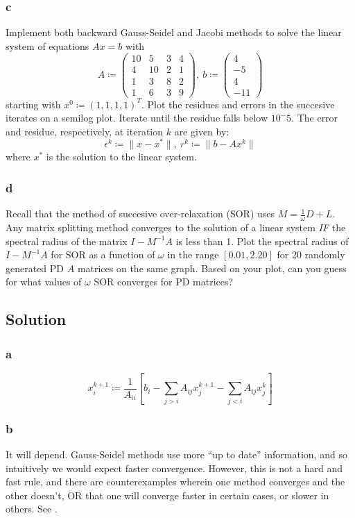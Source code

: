 \documentclass[11pt]{report}
\theoremstyle{definition}
\begin{document}
\subsubsection*{c}
Implement both backward Gauss-Seidel and Jacobi methods to solve the linear system of equations
$Ax=b$ with
\[
	A\coloneqq \begin{pmatrix}
		10 & 5  & 3 & 4 \\
		4  & 10 & 2 & 1 \\
		1  & 3  & 8 & 2 \\
		1  & 6  & 3 & 9
	\end{pmatrix},\
	b\coloneqq \begin{pmatrix}
		4 \\ -5 \\ 4 \\ -11
	\end{pmatrix}
\]
starting with $x^0\coloneqq (1,1,1,1)^T$. Plot the residues and errors in the
succesive iterates on a semilog plot. Iterate until the residue falls below $10^-5$. The error and residue, respectively, at iteration $k$ are given by:
\[ \epsilon^k\coloneqq \|x-x^*\|,\ r^k\coloneqq \|b-Ax^k\| \]
where $x^*$ is the solution to the linear system.

\subsubsection*{d}
Recall that the method of succesive over-relaxation (SOR) uses
$M=\frac{1}{\omega}D+L$. Any matrix splitting method converges to the solution
of a linear system \textit{IF} the spectral radius of the matrix $I-M^{-1}A$ is
less than 1. Plot the spectral radius of $I-M^{-1}A$ for SOR as a function of
$\omega$ in the range $[0.01, 2.20]$ for 20 randomly generated PD $A$ matrices
on the same graph. Based on your plot, can you guess for what values of $\omega$
SOR converges for PD matrices?


\subsection*{Solution}
\subsubsection*{a}
\[
	x_i^{k+1}\coloneqq \frac{1}{A_{ii}}\left[
	b_i - \sum_{j>i}A_{ij}x_{j}^{k+1}-\sum_{j<i}A_{ij}x_j^k
	\right]
\]

\subsubsection*{b}
It will depend. Gauss-Seidel methods use more ``up to date'' information, and so intuitively we would expect faster convergence. However,
this is not a hard and fast rule, and there are counterexamples wherein one method converges and the other doesn't, OR that one will converge faster in certain cases, or slower in others.
See \cite{Venit_1975}.
\end{document}
